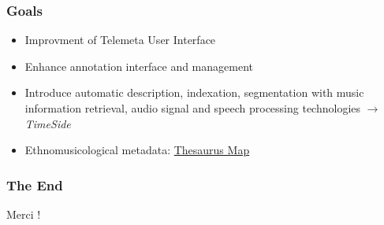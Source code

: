 \documentclass[10pt, final, hyperref, table]{beamer}
\begin{document}
\begin{frame}
\frametitle{Goals}
\begin{itemize}
\item Improvment of Telemeta User Interface
\item Enhance annotation interface and management
\item Introduce automatic description, indexation, segmentation with music information retrieval, audio signal and speech processing technologies $\rightarrow$ \emph{TimeSide} 
\item Ethnomusicological metadata: \href{Thesaurus.html}{Thesaurus
    Map}
\end{itemize}

\end{frame}
\begin{frame}
\frametitle{The End}
\begin{center}
  \LARGE Merci !
\end{center}
\end{frame}
\end{document}
